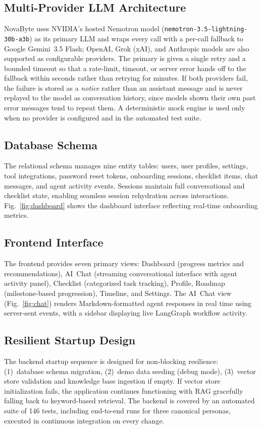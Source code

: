 \documentclass[conference]{IEEEtran}
\begin{document}
\subsection{Multi-Provider LLM Architecture}
NovaByte uses NVIDIA's hosted Nemotron model (\texttt{nemotron-3.5-lightning-30b-a3b}) as its primary LLM and wraps every call with a per-call fallback to Google Gemini~3.5 Flash; OpenAI, Grok (xAI), and Anthropic models are also supported as configurable providers. The primary is given a single retry and a bounded timeout so that a rate-limit, timeout, or server error hands off to the fallback within seconds rather than retrying for minutes. If both providers fail, the failure is stored as a \emph{notice} rather than an assistant message and is never replayed to the model as conversation history, since models shown their own past error messages tend to repeat them. A deterministic mock engine is used only when no provider is configured and in the automated test suite.

\subsection{Database Schema}
The relational schema manages nine entity tables: users, user profiles, settings, tool integrations, password reset tokens, onboarding sessions, checklist items, chat messages, and agent activity events. Sessions maintain full conversational and checklist state, enabling seamless session rehydration across interactions. Fig.~\ref{fig:dashboard} shows the dashboard interface reflecting real-time onboarding metrics.

\subsection{Frontend Interface}
The frontend provides seven primary views: Dashboard (progress metrics and recommendations), AI~Chat (streaming conversational interface with agent activity panel), Checklist (categorized task tracking), Profile, Roadmap (milestone-based progression), Timeline, and Settings. The AI~Chat view (Fig.~\ref{fig:chat}) renders Markdown-formatted agent responses in real time using server-sent events, with a sidebar displaying live LangGraph workflow activity.

\subsection{Resilient Startup Design}
The backend startup sequence is designed for non-blocking resilience: (1)~database schema migration, (2)~demo data seeding (debug mode), (3)~vector store validation and knowledge base ingestion if empty. If vector store initialization fails, the application continues functioning with RAG gracefully falling back to keyword-based retrieval. The backend is covered by an automated suite of 146 tests, including end-to-end runs for three canonical personas, executed in continuous integration on every change.
\end{document}
